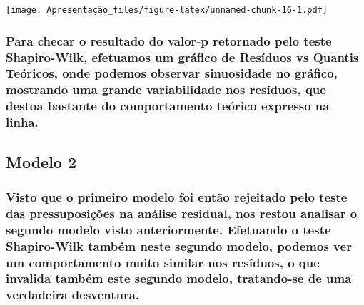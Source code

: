 \documentclass[]{article}
\begin{document}
\texttt{[image: Apresentação\_files/figure-latex/unnamed-chunk-16-1.pdf]}

\hypertarget{para-checar-o-resultado-do-valor-p-retornado-pelo-teste-shapiro-wilk-efetuamos-um-grafico-de-residuos-vs-quantis-teoricos-onde-podemos-observar-sinuosidade-no-grafico-mostrando-uma-grande-variabilidade-nos-residuos-que-destoa-bastante-do-comportamento-teorico-expresso-na-linha.}{%
\subsubsection{Para checar o resultado do valor-p retornado pelo teste
Shapiro-Wilk, efetuamos um gráfico de Resíduos vs Quantis Teóricos, onde
podemos observar sinuosidade no gráfico, mostrando uma grande
variabilidade nos resíduos, que destoa bastante do comportamento teórico
expresso na
linha.}\label{para-checar-o-resultado-do-valor-p-retornado-pelo-teste-shapiro-wilk-efetuamos-um-grafico-de-residuos-vs-quantis-teoricos-onde-podemos-observar-sinuosidade-no-grafico-mostrando-uma-grande-variabilidade-nos-residuos-que-destoa-bastante-do-comportamento-teorico-expresso-na-linha.}}

\hypertarget{modelo-2-1}{%
\subsection{Modelo 2}\label{modelo-2-1}}

\hypertarget{visto-que-o-primeiro-modelo-foi-entao-rejeitado-pelo-teste-das-pressuposicoes-na-analise-residual-nos-restou-analisar-o-segundo-modelo-visto-anteriormente.-efetuando-o-teste-shapiro-wilk-tambem-neste-segundo-modelo-podemos-ver-um-comportamento-muito-similar-nos-residuos-o-que-invalida-tambem-este-segundo-modelo-tratando-se-de-uma-verdadeira-desventura.}{%
\subsubsection{Visto que o primeiro modelo foi então rejeitado pelo
teste das pressuposições na análise residual, nos restou analisar o
segundo modelo visto anteriormente. Efetuando o teste Shapiro-Wilk
também neste segundo modelo, podemos ver um comportamento muito similar
nos resíduos, o que invalida também este segundo modelo, tratando-se de
uma verdadeira
desventura.}\label{visto-que-o-primeiro-modelo-foi-entao-rejeitado-pelo-teste-das-pressuposicoes-na-analise-residual-nos-restou-analisar-o-segundo-modelo-visto-anteriormente.-efetuando-o-teste-shapiro-wilk-tambem-neste-segundo-modelo-podemos-ver-um-comportamento-muito-similar-nos-residuos-o-que-invalida-tambem-este-segundo-modelo-tratando-se-de-uma-verdadeira-desventura.}}
\end{document}
